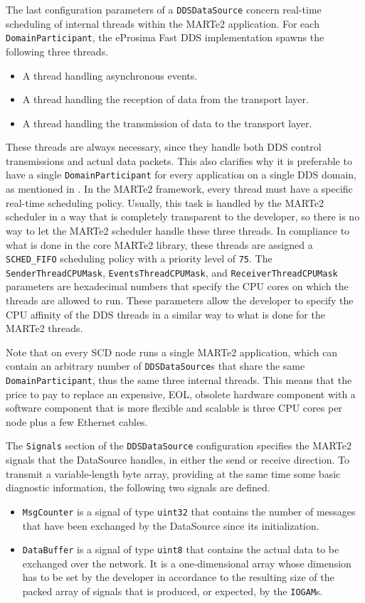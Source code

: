The last configuration parameters of a \texttt{DDSDataSource} concern real-time scheduling of internal threads within the MARTe2 application. For each \texttt{DomainParticipant}, the eProsima Fast DDS implementation spawns the following three threads.
\begin{itemize}
  \item A thread handling asynchronous events.
  \item A thread handling the reception of data from the transport layer.
  \item A thread handling the transmission of data to the transport layer.
\end{itemize}
These threads are always necessary, since they handle both DDS control transmissions and actual data packets. This also clarifies why it is preferable to have a single \texttt{DomainParticipant} for every application on a single DDS domain, as mentioned in . In the MARTe2 framework, every thread must have a specific real-time scheduling policy. Usually, this task is handled by the MARTe2 scheduler in a way that is completely transparent to the developer, so there is no way to let the MARTe2 scheduler handle these three threads. In compliance to what is done in the core MARTe2 library, these threads are assigned a \texttt{SCHED\_FIFO} scheduling policy with a priority level of \texttt{75}. The \texttt{SenderThreadCPUMask}, \texttt{EventsThreadCPUMask}, and \texttt{ReceiverThreadCPUMask} parameters are hexadecimal numbers that specify the CPU cores on which the threads are allowed to run. These parameters allow the developer to specify the CPU affinity of the DDS threads in a similar way to what is done for the MARTe2 threads.

Note that on every SCD node runs a single MARTe2 application, which can contain an arbitrary number of \texttt{DDSDataSource}s that share the same \texttt{DomainParticipant}, thus the same three internal threads. This means that the price to pay to replace an expensive, EOL, obsolete hardware component with a software component that is more flexible and scalable is three CPU cores per node plus a few Ethernet cables.

The \texttt{Signals} section of the \texttt{DDSDataSource} configuration specifies the MARTe2 signals that the DataSource handles, in either the send or receive direction. To transmit a variable-length byte array, providing at the same time some basic diagnostic information, the following two signals are defined.
\begin{itemize}
  \item \texttt{MsgCounter} is a signal of type \texttt{uint32} that contains the number of messages that have been exchanged by the DataSource since its initialization.
  \item \texttt{DataBuffer} is a signal of type \texttt{uint8} that contains the actual data to be exchanged over the network. It is a one-dimensional array whose dimension has to be set by the developer in accordance to the resulting size of the packed array of signals that is produced, or expected, by the \texttt{IOGAM}s.
\end{itemize}

